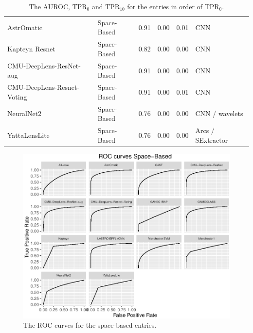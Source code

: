 \documentclass[useAMS,usenatbib]{mnras}
\begin{document}
\begin{table}
\begin{tabular}{llrrrl}
   AstrOmatic & Space-Based & 0.91 & 0.00 & 0.01 & CNN \\ 
   Kapteyn Resnet& Space-Based & 0.82 & 0.00 & 0.00 & CNN \\ 
   CMU-DeepLens-ResNet-aug & Space-Based & 0.91 & 0.00 & 0.00 & CNN \\ 
   CMU-DeepLens-Resnet-Voting & Space-Based & 0.91 & 0.00 & 0.01 & CNN \\ 
   NeuralNet2 & Space-Based & 0.76 & 0.00 & 0.00 & CNN / wavelets \\ 
   YattaLensLite & Space-Based & 0.76 & 0.00 & 0.00 & Arcs / SExtractor \\ 
   \hline
\end{tabular}
\caption{The AUROC, TPR$_0$ and TPR$_{10}$ for the entries in order of TPR$_0$.  }
\label{table:TPR0}
\end{table}

\begin{figure}
 \includegraphics[width=2\columnwidth]{figures/roc_space.pdf}
 \caption{The ROC curves for the space-based entries.}
 \label{fig:roc_space}
\end{figure}
\end{document}
